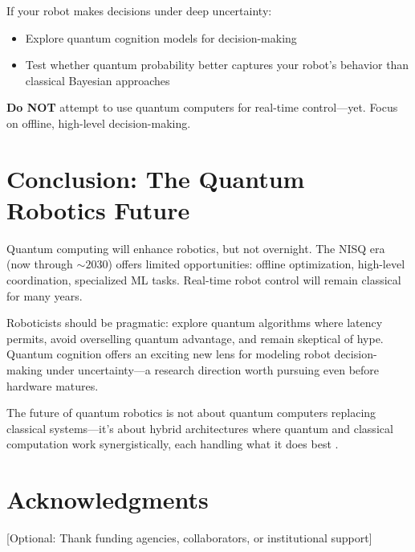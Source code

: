 \documentclass[journal]{IEEEtran}
\begin{document}
If your robot makes decisions under deep uncertainty:

\begin{itemize}
\item Explore quantum cognition models for decision-making \cite{b49, b62}
\item Test whether quantum probability better captures your robot's behavior than classical Bayesian approaches
\end{itemize}

\textbf{Do NOT} attempt to use quantum computers for real-time control---yet. Focus on offline, high-level decision-making.

\section{Conclusion: The Quantum Robotics Future}

Quantum computing will enhance robotics, but not overnight. The NISQ era (now through $\sim2030$) offers limited opportunities: offline optimization, high-level coordination, specialized ML tasks. Real-time robot control will remain classical for many years.

Roboticists should be pragmatic: explore quantum algorithms where latency permits, avoid overselling quantum advantage, and remain skeptical of hype. Quantum cognition offers an exciting new lens for modeling robot decision-making under uncertainty---a research direction worth pursuing even before hardware matures.

The future of quantum robotics is not about quantum computers replacing classical systems---it's about hybrid architectures where quantum and classical computation work synergistically, each handling what it does best \cite{b7, b20, b9}.

\section*{Acknowledgments}

[Optional: Thank funding agencies, collaborators, or institutional support]
\end{document}

